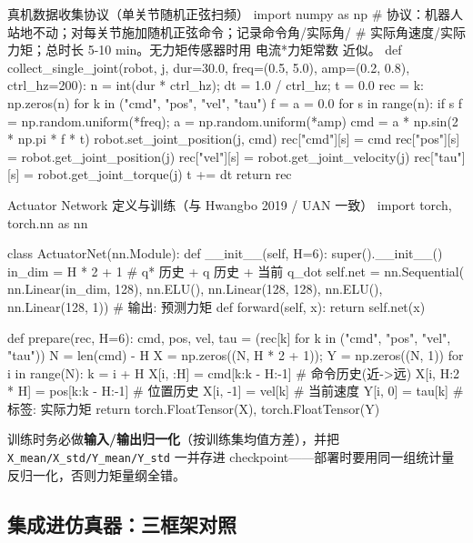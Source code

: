 \begin{codebox}[Python]{真机数据收集协议（单关节随机正弦扫频）}
import numpy as np
# 协议：机器人站地不动；对每关节施加随机正弦命令；记录命令角/实际角/
# 实际角速度/实际力矩；总时长 5-10 min。无力矩传感器时用 电流*力矩常数 近似。
def collect_single_joint(robot, j, dur=30.0, freq=(0.5, 5.0),
                         amp=(0.2, 0.8), ctrl_hz=200):
    n = int(dur * ctrl_hz); dt = 1.0 / ctrl_hz; t = 0.0
    rec = {k: np.zeros(n) for k in
           ("cmd", "pos", "vel", "tau")}
    f = a = 0.0
    for s in range(n):
        if s %
            f = np.random.uniform(*freq); a = np.random.uniform(*amp)
        cmd = a * np.sin(2 * np.pi * f * t)
        robot.set_joint_position(j, cmd)
        rec["cmd"][s] = cmd
        rec["pos"][s] = robot.get_joint_position(j)
        rec["vel"][s] = robot.get_joint_velocity(j)
        rec["tau"][s] = robot.get_joint_torque(j)
        t += dt
    return rec
\end{codebox}

\begin{codebox}[Python]{Actuator Network 定义与训练（与 Hwangbo 2019 / UAN 一致）}
import torch, torch.nn as nn

class ActuatorNet(nn.Module):
    def __init__(self, H=6):
        super().__init__()
        in_dim = H * 2 + 1                  # q* 历史 + q 历史 + 当前 q_dot
        self.net = nn.Sequential(
            nn.Linear(in_dim, 128), nn.ELU(),
            nn.Linear(128, 128),   nn.ELU(),
            nn.Linear(128, 1))             # 输出: 预测力矩
    def forward(self, x):
        return self.net(x)

def prepare(rec, H=6):
    cmd, pos, vel, tau = (rec[k] for k in ("cmd", "pos", "vel", "tau"))
    N = len(cmd) - H
    X = np.zeros((N, H * 2 + 1)); Y = np.zeros((N, 1))
    for i in range(N):
        k = i + H
        X[i, :H]     = cmd[k:k - H:-1]      # 命令历史(近->远)
        X[i, H:2 * H] = pos[k:k - H:-1]     # 位置历史
        X[i, -1]     = vel[k]               # 当前速度
        Y[i, 0]      = tau[k]               # 标签: 实际力矩
    return torch.FloatTensor(X), torch.FloatTensor(Y)
\end{codebox}

训练时务必做\textbf{输入/输出归一化}（按训练集均值方差），并把 \verb|X_mean/X_std/Y_mean/Y_std| 一并存进 checkpoint——部署时要用同一组统计量反归一化，否则力矩量纲全错。

\subsection{集成进仿真器：三框架对照}
\label{sec:rlmc-act-net-integrate}

